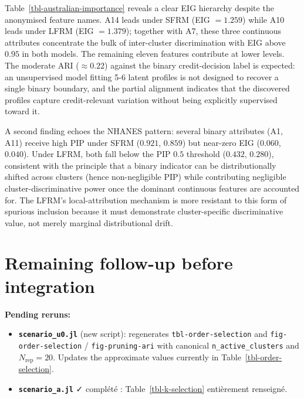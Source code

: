 \documentclass[
  letterpaper,
  DIV=11,
  numbers=noendperiod]{scrartcl}
\begin{document}
Table~\ref{tbl-australian-importance} reveals a clear EIG hierarchy
despite the anonymised feature names. A14 leads under SFRM (EIG
\(= 1.259\)) while A10 leads under LFRM (EIG \(= 1.379\)); together with
A7, these three continuous attributes concentrate the bulk of
inter-cluster discrimination with EIG above \(0.95\) in both models. The
remaining eleven features contribute at lower levels. The moderate ARI
(\(\approx 0.22\)) against the binary credit-decision label is expected:
an unsupervised model fitting 5-6 latent profiles is not designed to
recover a single binary boundary, and the partial alignment indicates
that the discovered profiles capture credit-relevant variation without
being explicitly supervised toward it.

A second finding echoes the NHANES pattern: several binary attributes
(A1, A11) receive high PIP under SFRM (\(0.921\), \(0.859\)) but
near-zero EIG (\(0.060\), \(0.040\)). Under LFRM, both fall below the
PIP \(0.5\) threshold (\(0.432\), \(0.280\)), consistent with the
principle that a binary indicator can be distributionally shifted across
clusters (hence non-negligible PIP) while contributing negligible
cluster-discriminative power once the dominant continuous features are
accounted for. The LFRM's local-attribution mechanism is more resistant
to this form of spurious inclusion because it must demonstrate
cluster-specific discriminative value, not merely marginal
distributional drift.

\section{Remaining follow-up before
integration}\label{remaining-follow-up-before-integration}

\textbf{Pending reruns:}

\begin{itemize}
\item
  \textbf{\texttt{scenario\_u0.jl}} (new script): regenerates
  \texttt{tbl-order-selection} and \texttt{fig-order-selection} /
  \texttt{fig-pruning-ari} with canonical \texttt{n\_active\_clusters}
  and \(N_{\text{rep}}=20\). Updates the approximate values currently in
  Table~\ref{tbl-order-selection}.
\item
  \textbf{\texttt{scenario\_a.jl}} ✓ complété :
  Table~\ref{tbl-k-selection} entièrement renseigné.
\end{itemize}
\end{document}
